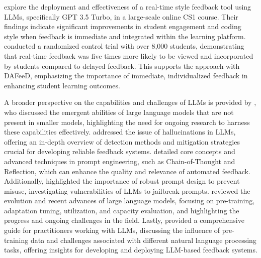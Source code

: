 \documentclass[manuscript,screen,review, anonymous]{acmart}
\begin{document}
\citet{woodrow:2024:AITeachesArt} explore the deployment and effectiveness of a real-time style feedback tool using LLMs, specifically GPT 3.5 Turbo, in a large-scale online CS1 course.
Their findings indicate significant improvements in student engagement and coding style when feedback is immediate and integrated within the learning platform.
\citeauthor{woodrow:2024:AITeachesArt} conducted a randomized control trial with over 8,000 students, demonstrating that real-time feedback was five times more likely to be viewed and incorporated by students compared to delayed feedback.
This supports the approach with DAFeeD, emphasizing the importance of immediate, individualized feedback in enhancing student learning outcomes.

A broader perspective on the capabilities and challenges of LLMs is provided by \citet{wei:2022:EmergentAbilitiesLarge}, who discussed the emergent abilities of large language models that are not present in smaller models, highlighting the need for ongoing research to harness these capabilities effectively.
\citet{huang:2023:SurveyHallucinationLargeb} addressed the issue of hallucinations in LLMs, offering an in-depth overview of detection methods and mitigation strategies crucial for developing reliable feedback systems.
\citet{amatriain:2024:PromptDesignEngineering} detailed core concepts and advanced techniques in prompt engineering, such as Chain-of-Thought and Reflection, which can enhance the quality and relevance of automated feedback.
Additionally, \citet{liu:2024:JailbreakingChatGPTPrompt} highlighted the importance of robust prompt design to prevent misuse, investigating vulnerabilities of LLMs to jailbreak prompts.
\citet{zhao:2023:SurveyLargeLanguage} reviewed the evolution and recent advances of large language models, focusing on pre-training, adaptation tuning, utilization, and capacity evaluation, and highlighting the progress and ongoing challenges in the field.
Lastly, \citet{yang:2024:HarnessingPowerLLMs} provided a comprehensive guide for practitioners working with LLMs, discussing the influence of pre-training data and challenges associated with different natural language processing tasks, offering insights for developing and deploying LLM-based feedback systems.
\end{document}
